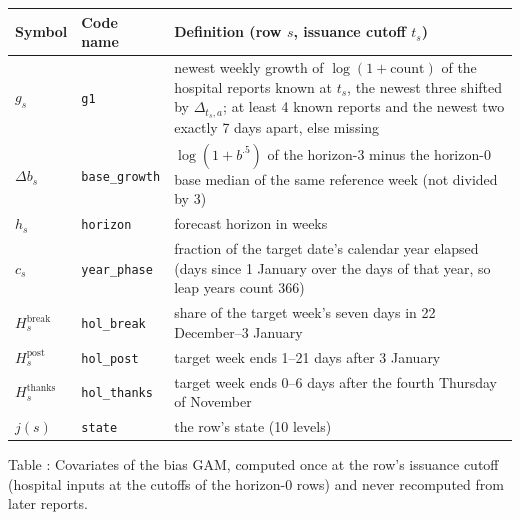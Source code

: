 \documentclass[11pt,a4paper]{article}
\theoremstyle{definition}
\theoremstyle{remark}
\begin{document}
\begin{center}
\small
\begin{tabularx}{\linewidth}{@{}p{1.8cm}p{2.3cm}X@{}}
\toprule
Symbol & Code name & Definition (row $s$, issuance cutoff $t_s$)\\
\midrule
$g_s$ & \texttt{g1} & newest weekly growth of $\log(1+\text{count})$ of the
hospital reports known at $t_s$, the newest three shifted by
$\Delta_{t_s,a}$; at least 4 known reports and the newest two exactly 7 days
apart, else missing\\
$\Delta b_s$ & \texttt{base\_growth} & $\log(1+b^{.5})$ of the horizon-3
minus the horizon-0 base median of the same reference week (not divided by
3)\\
$h_s$ & \texttt{horizon} & forecast horizon in weeks\\
$c_s$ & \texttt{year\_phase} & fraction of the target date's calendar year
elapsed (days since 1 January over the days of that year, so leap years
count 366)\\
$H^{\mathrm{break}}_s$ & \texttt{hol\_break} & share of the target week's
seven days in 22 December--3 January\\
$H^{\mathrm{post}}_s$ & \texttt{hol\_post} & target week ends 1--21 days
after 3 January\\
$H^{\mathrm{thanks}}_s$ & \texttt{hol\_thanks} & target week ends 0--6 days
after the fourth Thursday of November\\
$j(s)$ & \texttt{state} & the row's state (10 levels)\\
\bottomrule
\end{tabularx}
\end{center}
\label{tab:bias-covariates}
\begin{center}\small Table \thetable: Covariates of the bias GAM, computed
once at the row's issuance cutoff (hospital inputs at the cutoffs of the
horizon-0 rows) and never recomputed from later reports.
\end{center}
\end{document}
